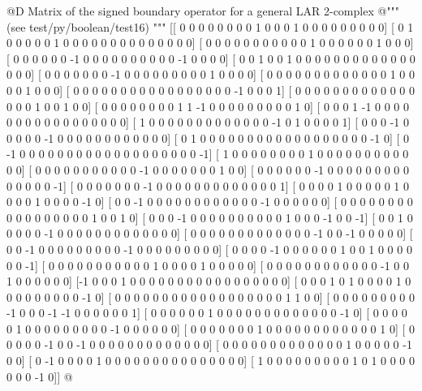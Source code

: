 \documentclass[11pt,oneside]{article}    %
\begin{document}
@D Matrix of the signed boundary operator for a general LAR 2-complex
@{""" (see test/py/boolean/test16) """
[[ 0  0  0  0  0  0  0  0  1  0  0  0  1  0  0  0  0  0  0  0  0  0]
 [ 0  1  0  0  0  0  0  1  0  0  0  0  0  0  0  0  0  0  0  0  0  0]
 [ 0  0  0  0  0  0  0  0  0  0  0  1  0  0  0  0  0  0  1  0  0  0]
 [ 0  0  0  0  0  0 -1  0  0  0  0  0  0  0  0  0  0 -1  0  0  0  0]
 [ 0  0  1  0  0  1  0  0  0  0  0  0  0  0  0  0  0  0  0  0  0  0]
 [ 0  0  0  0  0  0  0 -1  0  0  0  0  0  0  0  0  0  1  0  0  0  0]
 [ 0  0  0  0  0  0  0  0  0  0  0  0  0  1  0  0  0  0  1  0  0  0]
 [ 0  0  0  0  0  0  0  0  0  0  0  0  0  0  0  0  0 -1  0  0  0  1]
 [ 0  0  0  0  0  0  0  0  0  0  0  0  0  0  0  0  1  0  0  1  0  0]
 [ 0  0  0  0  0  0  0  0  1  1 -1  0  0  0  0  0  0  0  0  0  1  0]
 [ 0  0  0  1 -1  0  0  0  0  0  0  0  0  0  0  0  0  0  0  0  0  0]
 [ 1  0  0  0  0  0  0  0  0  0  0  0  0  0 -1  0  1  0  0  0  0  1]
 [ 0  0  0 -1  0  0  0  0  0 -1  0  0  0  0  0  0  0  0  0  0  0  0]
 [ 0  1  0  0  0  0  0  0  0  0  0  0  0  0  0  0  0  0  0  0 -1  0]
 [ 0 -1  0  0  0  0  0  0  0  0  0  0  0  0  0  0  0  0  0  0  0 -1]
 [ 1  0  0  0  0  0  0  0  0  1  0  0  0  0  0  0  0  0  0  0  0  0]
 [ 0  0  0  0  0  0  0  0  0  0  0 -1  0  0  0  0  0  0  0  1  0  0]
 [ 0  0  0  0  0  0 -1  0  0  0  0  0  0  0  0  0  0  0  0  0  0 -1]
 [ 0  0  0  0  0  0  0 -1  0  0  0  0  0  0  0  0  0  0  0  0  0  1]
 [ 0  0  0  0  1  0  0  0  0  0  1  0  0  0  0  1  0  0  0  0 -1  0]
 [ 0  0 -1  0  0  0  0  0  0  0  0  0  0  0  0 -1  0  0  0  0  0  0]
 [ 0  0  0  0  0  0  0  0  0  0  0  0  0  0  0  0  0  1  0  0  1  0]
 [ 0  0  0 -1  0  0  0  0  0  0  0  0  0  0  1  0  0  0 -1  0  0 -1]
 [ 0  0  1  0  0  0  0  0 -1  0  0  0  0  0  0  0  0  0  0  0  0  0]
 [ 0  0  0  0  0  0  0  0  0  0  0  0  0 -1  0  0 -1  0  0  0  0  0]
 [ 0  0 -1  0  0  0  0  0  0  0  0  0 -1  0  0  0  0  0  0  0  0  0]
 [ 0  0  0  0 -1  0  0  0  0  0  0  1  0  0  1  0  0  0  0  0  0 -1]
 [ 0  0  0  0  0  0  0  0  0  0  0  1  0  0  0  0  1  0  0  0  0  0]
 [ 0  0  0  0  0  0  0  0  0  0  0  0 -1  0  0  1  0  0  0  0  0  0]
 [-1  0  0  0  1  0  0  0  0  0  0  0  0  0  0  0  0  0  0  0  0  0]
 [ 0  0  0  1  0  1  0  0  0  0  1  0  0  0  0  0  0  0  0  0 -1  0]
 [ 0  0  0  0  0  0  0  0  0  0  0  0  0  0  0  0  0  0  1  1  0  0]
 [ 0  0  0  0  0  0  0  0  0 -1  0  0  0 -1 -1  0  0  0  0  0  0  1]
 [ 0  0  0  0  0  0  1  0  0  0  0  0  0  0  0  0  0  0  0  0 -1  0]
 [ 0  0  0  0  0  1  0  0  0  0  0  0  0  0  0 -1  0  0  0  0  0  0]
 [ 0  0  0  0  0  0  0  1  0  0  0  0  0  0  0  0  0  0  0  0  1  0]
 [ 0  0  0  0  0 -1  0  0 -1  0  0  0  0  0  0  0  0  0  0  0  0  0]
 [ 0  0  0  0  0  0  0  0  0  0  0  0  0  1  0  0  0  0  0 -1  0  0]
 [ 0 -1  0  0  0  0  1  0  0  0  0  0  0  0  0  0  0  0  0  0  0  0]
 [ 1  0  0  0  0  0  0  0  0  0  1  0  1  0  0  0  0  0  0  0 -1  0]]
 @}
\end{document}
